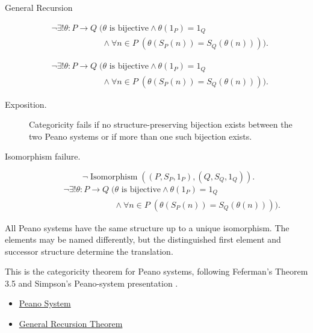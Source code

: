 \begin{topicbox}{General Recursion}
\begin{remark*}
\[
\begin{aligned}
&\neg\exists! \theta:P\to Q\;
\bigl(\theta \text{ is bijective}\land \theta(1_P)=1_Q\\
&\qquad\qquad\qquad\land
\forall n\in P\;(\theta(S_P(n))=S_Q(\theta(n)))\bigr).
\end{aligned}
\]
\end{remark*}

\begin{remark*}
\[
\begin{aligned}
&\neg\exists! \theta:P\to Q\;
\bigl(\theta \text{ is bijective}\land \theta(1_P)=1_Q\\
&\qquad\qquad\qquad\land
\forall n\in P\;(\theta(S_P(n))=S_Q(\theta(n)))\bigr).
\end{aligned}
\]
\end{remark*}

\begin{remark*}
\begin{description}
  \item[Exposition.]
  Categoricity fails if no structure-preserving bijection exists between the
  two Peano systems or if more than one such bijection exists.
  \item[Isomorphism failure.]
  \[
  \neg\operatorname{Isomorphism}((P,S_P,1_P),(Q,S_Q,1_Q)).
  \]
  \[
  \begin{aligned}
  &\neg\exists! \theta:P\to Q\;
  \bigl(\theta \text{ is bijective}\land \theta(1_P)=1_Q\\
  &\qquad\qquad\qquad\land
  \forall n\in P\;(\theta(S_P(n))=S_Q(\theta(n)))\bigr).
  \end{aligned}
  \]
\end{description}
\end{remark*}

\begin{remark*}[Interpretation]
All Peano systems have the same structure up to a unique isomorphism. The
elements may be named differently, but the distinguished first element and
successor structure determine the translation.
\end{remark*}

\begin{remark*}
This is the categoricity theorem for Peano systems, following Feferman's
Theorem 3.5 and Simpson's Peano-system presentation
\citep{FefermanNumberSystems1964,simpson2011peanosystems}.
\end{remark*}

\begin{dependencies}
\begin{itemize}
  \item \hyperref[def:peano-system]{Peano System}
  \item \hyperref[thm:general-recursion-theorem-for-peano-system]{General Recursion Theorem}
\end{itemize}
\end{dependencies}
\end{topicbox}
